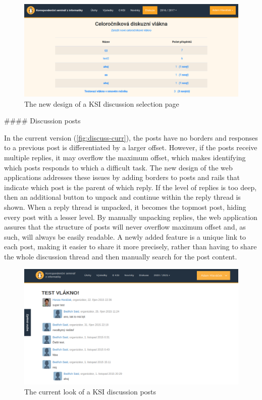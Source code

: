 \documentclass[
  digital, %
  oneside, %
  lof,     %
  nolot,     %
]{fithesis4}
\begin{document}
{\begin{figure}
\includegraphics[width=\textwidth]{assets/img/discussionroot-new}
\caption{The new design of a \acrshort{KSI} discussion selection page}
\label{fig:discussroot-new}
\end{figure}

#### Discussion posts

In the current version (\autoref{fig:discuss-curr}), the posts have no borders and responses to a previous post is differentiated by a larger offset. However, if the posts receive multiple replies, it may overflow the maximum offset, which makes identifying which posts responds to which a difficult task. The new design of the web applications addresses these issues by adding borders to posts and rails that indicate which post is the parent of which reply. If the level of replies is too deep, then an additional button to unpack and continue within the reply thread is shown. When a reply thread is unpacked, it becomes the topmost post, hiding every post with a lesser level. By manually unpacking replies, the web application assures that the structure of posts will never overflow maximum offset and, as such, will always be easily readable. A newly added feature is a unique link to each post, making it easier to share it more precisely, rather than having to share the whole discussion thread and then manually search for the post content.

\begin{figure}
\includegraphics[width=\textwidth]{assets/img/discussion-curr}
\caption{The current look of a \acrshort{KSI} discussion posts}
\label{fig:discuss-curr}
\end{figure}

}
\end{document}
